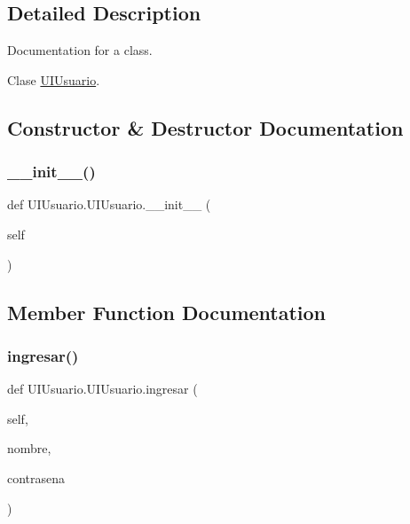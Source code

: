 \subsection{Detailed Description}
Documentation for a class. 

Clase \mbox{\hyperlink{class_u_i_usuario_1_1_u_i_usuario}{U\+I\+Usuario}}. 

\subsection{Constructor \& Destructor Documentation}
\mbox{\label{class_u_i_usuario_1_1_u_i_usuario_a1e65f56af297fce4d5b3ed7613f1d0fa}} 
\subsubsection{\texorpdfstring{\+\_\+\+\_\+init\+\_\+\+\_\+()}{\_\_init\_\_()}}
{\footnotesize\ttfamily def U\+I\+Usuario.\+U\+I\+Usuario.\+\_\+\+\_\+init\+\_\+\+\_\+ (\begin{DoxyParamCaption}\item[{}]{self }\end{DoxyParamCaption})}



\subsection{Member Function Documentation}
\mbox{\label{class_u_i_usuario_1_1_u_i_usuario_ad83e1ef18f57b281a7708fd8ef0d3da4}} 
\subsubsection{\texorpdfstring{ingresar()}{ingresar()}}
{\footnotesize\ttfamily def U\+I\+Usuario.\+U\+I\+Usuario.\+ingresar (\begin{DoxyParamCaption}\item[{}]{self,  }\item[{}]{nombre,  }\item[{}]{contrasena }\end{DoxyParamCaption})}



